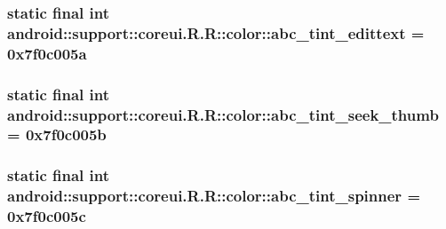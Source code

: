 \hypertarget{classandroid_1_1support_1_1coreui_1_1_r_1_1color_43593616cfbb4cb131733e9e7a042e6b}{
\subsubsection[{abc\_\-tint\_\-edittext}]{\setlength{\rightskip}{0pt plus 5cm}static final int android::support::coreui.R.R::color::abc\_\-tint\_\-edittext = 0x7f0c005a}}
\label{classandroid_1_1support_1_1coreui_1_1_r_1_1color_43593616cfbb4cb131733e9e7a042e6b}


\hypertarget{classandroid_1_1support_1_1coreui_1_1_r_1_1color_fcb885012803d47fac4be89ff16eaaf5}{
\subsubsection[{abc\_\-tint\_\-seek\_\-thumb}]{\setlength{\rightskip}{0pt plus 5cm}static final int android::support::coreui.R.R::color::abc\_\-tint\_\-seek\_\-thumb = 0x7f0c005b}}
\label{classandroid_1_1support_1_1coreui_1_1_r_1_1color_fcb885012803d47fac4be89ff16eaaf5}


\hypertarget{classandroid_1_1support_1_1coreui_1_1_r_1_1color_57e59d78c0eb09bac0fe36b17c6392c2}{
\subsubsection[{abc\_\-tint\_\-spinner}]{\setlength{\rightskip}{0pt plus 5cm}static final int android::support::coreui.R.R::color::abc\_\-tint\_\-spinner = 0x7f0c005c}}
\label{classandroid_1_1support_1_1coreui_1_1_r_1_1color_57e59d78c0eb09bac0fe36b17c6392c2}


